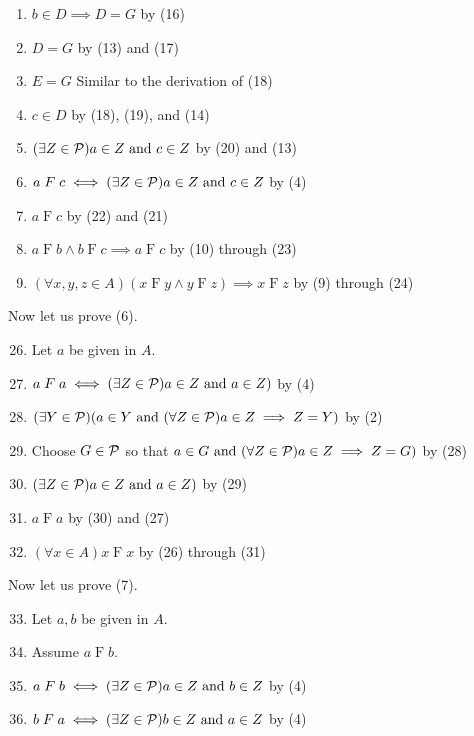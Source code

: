 \begin{solution}
\begin{enumerate}[label=(\arabic*)]
    \item \quad\quad $b\in D \implies D=G$ \hfill by (16)
    \item \quad\quad $D=G$ \hfill by (13) and (17)
    \item \quad\quad $E=G$ \hfill Similar to the derivation of (18)
    \item \quad\quad $c\in D$ \hfill by (18), (19), and (14)
    \item \quad\quad $(\exists Z\in\mathcal{P})a\in Z\text{ and } c\in Z$ \hfill by (20) and (13)
    \item \quad\quad $a\mathrel F c \iff (\exists Z\in\mathcal{P}) a\in Z\text{ and } c\in Z$ \hfill by (4)
    \item \quad\quad $a\mathrel F c$ \hfill by (22) and (21)
    \item \quad $a\mathrel F b\land b\mathrel F c \implies a\mathrel F c$ \hfill by (10) through (23)
    \item $(\forall x,y,z\in A)(x\mathrel F y\land y\mathrel F z)\implies x\mathrel F z$ \hfill by (9) through (24)
\end{enumerate}
Now let us prove (6).
\begin{enumerate}[label=(\arabic*)]
    \setcounter{enumi}{25}
    \item Let $a$ be given in $A$.
    \item \quad $a\mathrel F a \iff (\exists Z\in\mathcal{P})a\in Z\text{ and } a\in Z)$ \hfill by (4)
    \item \quad $(\exists Y\in\mathcal{P})(a\in Y\text{ and } (\forall Z\in\mathcal{P})a\in Z\implies Z=Y)$ \hfill by (2)
    \item \quad Choose $G\in\mathcal{P}$ so that $a\in G\text{ and } (\forall Z\in\mathcal{P})a\in Z\implies Z=G)$ \hfill by (28)
    \item \quad $(\exists Z\in\mathcal{P})a\in Z\text{ and } a\in Z)$ \hfill by (29)
    \item \quad $a\mathrel F a$ \hfill by (30) and (27)
    \item $(\forall x\in A)x\mathrel F x$ \hfill by (26) through (31)
\end{enumerate}
Now let us prove (7).
\begin{enumerate}[label=(\arabic*)]
    \setcounter{enumi}{32}
    \item Let $a,b$ be given in $A$.
    \item \quad Assume $a\mathrel F b$.
    \item \quad\quad $a\mathrel F b\iff (\exists Z\in\mathcal{P})a\in Z\text{ and } b\in Z$ \hfill by (4)
    \item \quad\quad $b\mathrel F a\iff (\exists Z\in\mathcal{P})b\in Z\text{ and } a\in Z$ \hfill by (4)

\end{enumerate}
\end{solution}

